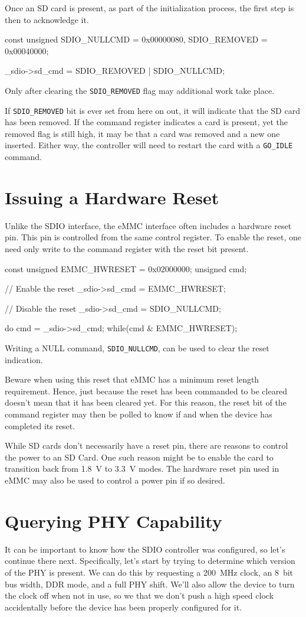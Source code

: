 \documentclass{gqtekspec}
\begin{document}
Once an SD card is present, as part of the initialization process, the first
step is then to acknowledge it.
\begin{zCpp}
	const	unsigned	SDIO_NULLCMD  = 0x00000080,
				SDIO_REMOVED  = 0x00040000;

	_sdio->sd_cmd = SDIO_REMOVED | SDIO_NULLCMD;
\end{zCpp}
Only after clearing the {\tt SDIO\_REMOVED} flag may additional work take
place.

If {\tt SDIO\_REMOVED} bit is ever set from here on out, it will indicate that
the SD card has been removed.  If the command register indicates a card is
present, yet the removed flag is still high, it may be that a card was removed
and a new one inserted.  Either way, the controller will need to restart
the card with a {\tt GO\_IDLE} command.

\section{Issuing a Hardware Reset}
Unlike the SDIO interface, the eMMC interface often includes a hardware reset
pin.  This pin is controlled from the same control register.  To enable the
reset, one need only write to the command register with the reset bit present.
\begin{zCpp}
	const	unsigned	EMMC_HWRESET  = 0x02000000;
	unsigned	cmd;

	// Enable the reset
	_sdio->sd_cmd = EMMC_HWRESET;

	// Disable the reset
	_sdio->sd_cmd = SDIO_NULLCMD;

	do {
		cmd = _sdio->sd_cmd;
	} while(cmd & EMMC_HWRESET);
\end{zCpp}
Writing a NULL command, {\tt SDIO\_NULLCMD}, can be used to clear the reset
indication.

Beware when using this reset that eMMC has a minimum reset length requirement.
Hence, just because the reset has been commanded to be cleared doesn't mean
that it has been cleared yet.  For this reason, the reset bit of the command
register may then be polled to know if and when the device has completed its
reset.

While SD cards don't necessarily have a reset pin, there are reasons to control
the power to an SD Card.  One such reason might be to enable the card to
transition back from 1.8~V to 3.3~V modes.  The hardware reset pin used in
eMMC may also be used to control a power pin if so desired.
\section{Querying PHY Capability}\label{sec:phy-query}
It can be important to know how the SDIO controller was configured, so let's
continue there next.  Specifically, let's start by trying to determine which
version of the PHY is present.  We can do this by requesting a 200~MHz clock,
an 8~bit bus width, DDR mode, and a full PHY shift.  We'll also allow the
device to turn the clock off when not in use, so we that we don't push a high
speed clock accidentally before the device has been properly configured
for it.
\end{document}
